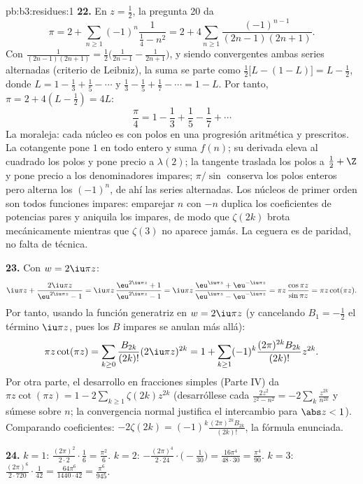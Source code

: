 \begin{solution}{pb:b3:residues:1}
\textbf{22.} En $z = \frac12$, la pregunta 20 da
\[
\pi = 2 + \sum_{n\geq1}(-1)^n\frac{1}{\frac14 - n^2}
= 2 + 4\sum_{n\geq1}\frac{(-1)^{n-1}}{(2n-1)(2n+1)} .
\]
Con $\frac1{(2n-1)(2n+1)} = \frac12\bigl(\frac1{2n-1} -
\frac1{2n+1}\bigr)$, y siendo convergentes ambas series alternadas
(criterio de Leibniz), la suma se parte como $\frac12\bigl[L -
(1 - L)\bigr] = L - \frac12$, donde $L = 1 - \frac13 +
\frac15 - \cdots$ y $\frac13 - \frac15 + \frac17 - \cdots
= 1 - L$. Por tanto, $\pi = 2 + 4(L - \frac12) = 4L$:
\[
\frac\pi4 = 1 - \frac13 + \frac15 - \frac17 + \cdots
\]
La moraleja: cada núcleo es
 con polos en una
progresión aritmética y 
prescritos. La cotangente pone
 $1$ en todo entero y
suma $f(n)$; su derivada eleva al cuadrado los polos y pone precio a
$\lambda(2)$; la tangente traslada los polos a $\frac12 + \Z$ y pone
precio a los denominadores impares; $\pi/\sin$ conserva los polos
enteros pero alterna los
 $(-1)^n$, de ahí las
series alternadas. Los núcleos de primer orden son todos funciones
impares: emparejar $n$ con $-n$ duplica los coeficientes de potencias
pares y aniquila los impares, de modo que $\zeta(2k)$ brota
mecánicamente mientras que $\zeta(3)$ no aparece jamás. La ceguera es de
paridad, no falta de técnica.

\textbf{23.} Con $w = 2\iu\pi z$:
\[
\iu\pi z + \frac{2\iu\pi z}{\eu^{2\iu\pi z} - 1}
= \iu\pi z\,\frac{\eu^{2\iu\pi z} + 1}{\eu^{2\iu\pi z} - 1}
= \iu\pi z\,\frac{\eu^{\iu\pi z} +
\eu^{-\iu\pi z}}{\eu^{\iu\pi z} - \eu^{-\iu\pi z}}
= \pi z\,\frac{\cos\pi z}{\sin\pi z} = \pi z\cot(\pi z) .
\]
Por tanto, usando la función generatriz en $w = 2\iu\pi z$ (y cancelando
$B_1 = -\frac12$ el término $\iu\pi z$, pues los $B$ impares se anulan
más allá):
\[
\pi z\cot(\pi z) = \sum_{k\geq0}\frac{B_{2k}}{(2k)!}
(2\iu\pi z)^{2k}
= 1 + \sum_{k\geq1}(-1)^k\frac{(2\pi)^{2k}B_{2k}}{(2k)!}
z^{2k} .
\]
Por otra parte, el desarrollo en fracciones simples (Parte IV) da
$\pi z\cot(\pi z) = 1 - 2\sum_{k\geq1}\zeta(2k)z^{2k}$ (desarróllese
cada $\frac{2z^2}{z^2 - n^2} =
-2\sum_k\frac{z^{2k}}{n^{2k}}$ y súmese sobre $n$; la convergencia
normal justifica el intercambio para $\abs z < 1$). Comparando
coeficientes: $-2\zeta(2k) =
(-1)^k\frac{(2\pi)^{2k}B_{2k}}{(2k)!}$, la fórmula enunciada.

\textbf{24.} $k = 1$: $\frac{(2\pi)^2}{2\cdot2}\cdot\frac16
= \frac{\pi^2}6$. $k = 2$: $-\frac{(2\pi)^4}{2\cdot24}
\cdot\bigl(-\frac1{30}\bigr) = \frac{16\pi^4}{48\cdot30} =
\frac{\pi^4}{90}$. $k = 3$: $\frac{(2\pi)^6}{2\cdot720}
\cdot\frac1{42} = \frac{64\pi^6}{1440\cdot42} =
\frac{\pi^6}{945}$.


\end{solution}
